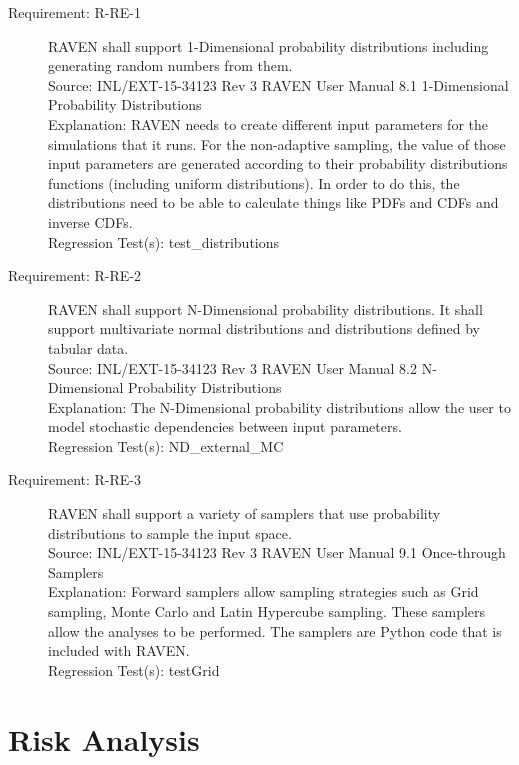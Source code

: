 \documentclass{article}
\newcommand{\requirement}[5]{\item[Requirement: #1] #2 \\Source: #3\\Explanation: #4\\Regression Test(s): #5}
\begin{document}
\begin{description}

\requirement{R-RE-1}{RAVEN shall support 1-Dimensional probability distributions including generating random numbers from them.}
{INL/EXT-15-34123 Rev 3 RAVEN User Manual 8.1 1-Dimensional Probability Distributions}
{RAVEN needs to create different input parameters for the simulations that it runs.  For the non-adaptive sampling, the value of those input parameters are generated according to their probability distributions functions (including uniform distributions).  In order to do this, the distributions need to be able to calculate things like PDFs and CDFs and inverse CDFs.}
{test\_distributions}

\requirement{R-RE-2}{RAVEN shall support N-Dimensional probability distributions.  It shall support multivariate normal distributions and distributions defined by tabular data.}
{INL/EXT-15-34123 Rev 3 RAVEN User Manual 8.2 N-Dimensional Probability Distributions}
{The N-Dimensional probability distributions allow the user to model stochastic dependencies between input parameters.}
{ND\_external\_MC}

\requirement{R-RE-3}{RAVEN shall support a variety of samplers that use probability distributions to sample the input space.}
{INL/EXT-15-34123 Rev 3 RAVEN User Manual 9.1 Once-through Samplers}
{Forward samplers allow sampling strategies such as Grid sampling, Monte Carlo and Latin Hypercube sampling.  These samplers allow the analyses to be performed.  The samplers are Python code that is included with RAVEN.}
{testGrid}

\end{description}

\section{Risk Analysis}
\end{document}
